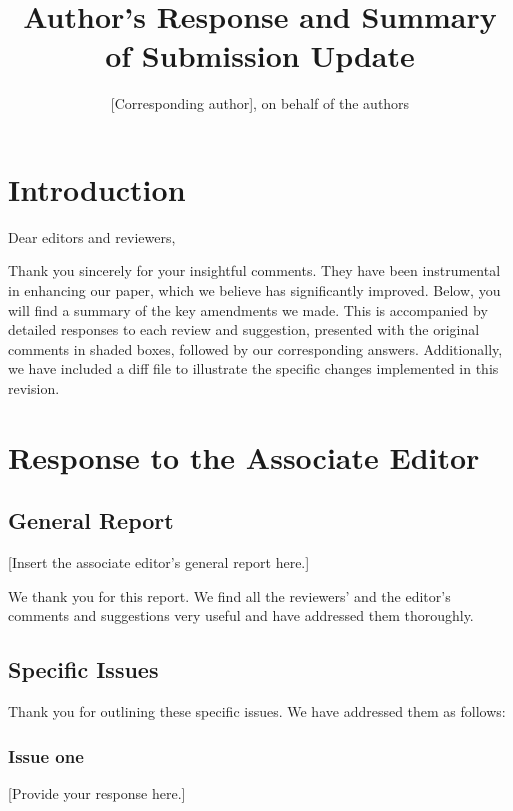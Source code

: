 \documentclass{article}
\newenvironment{revquote*}[1][]{%
  \begin{tcolorbox}[
    title= #1, %
    enhanced, 
    breakable, 
    colback=dgrey!5!white, 
    colframe=dgrey!75!black,
    boxrule=0.5pt,
    arc=0.5mm, %
    left=1mm,
    right=1mm,
    top=1mm,
    bottom=1mm
    ]
  \ttfamily\small
}{%
  \end{tcolorbox}
}
\begin{document}
\title{Author's Response and Summary of Submission Update}
\author{[Corresponding author], on behalf of the authors}

\maketitle
\tableofcontents{}

\section{Introduction}

Dear editors and reviewers,

Thank you sincerely for your insightful comments. They have been instrumental in enhancing our paper, which we believe has significantly improved. Below, you will find a summary of the key amendments we made. This is accompanied by detailed responses to each review and suggestion, presented with the original comments in shaded boxes, followed by our corresponding answers. Additionally, we have included a diff file to illustrate the specific changes implemented in this revision.

\section{Response to the Associate Editor}

\subsection{General Report}
\begin{revquote*} \label{sec:ae-response}
[Insert the associate editor's general report here.]
\end{revquote*}

We thank you for this report. We find all the reviewers' and the editor's comments and suggestions very useful and have addressed them thoroughly.

\subsection{Specific Issues}
\begin{revquote*}
\end{revquote*}

Thank you for outlining these specific issues. We have addressed them as follows:

\subsubsection{Issue one}
[Provide your response here.]
\end{document}
